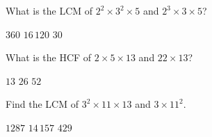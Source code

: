 \documentclass{article}
\begin{document}
\begin{questions}
\question
What is the LCM of $2^2\times 3^2\times 5$ and $2^3\times 3\times 5$?
\begin{choices}
\correctchoice $360$
\choice $16\,120$
\choice $30$
\end{choices}

\question
What is the HCF of $2\times 5\times 13$ and $22\times 13$?
\begin{choices}
\choice $13$
\correctchoice $26$
\choice $52$
\end{choices}

\question
Find the LCM of $3^2\times 11\times 13$ and $3\times 11^2$.
\begin{choices}
\choice $1287$
\correctchoice $14\,157$
\choice $429$
\end{choices}

\end{questions}


\end{document}
